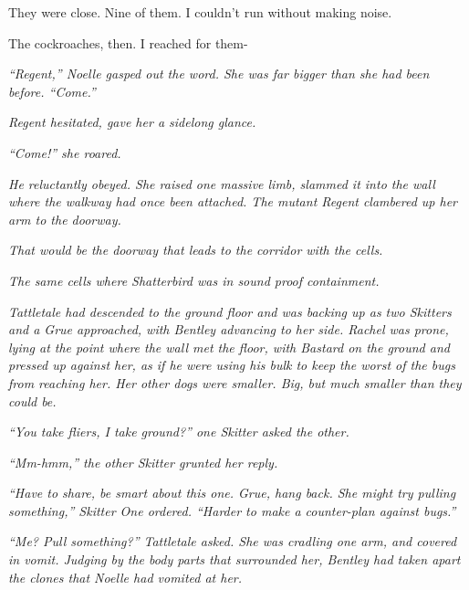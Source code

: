 They were close.  Nine of them.  I couldn't run without making noise.



The cockroaches, then.  I reached for them-



\sectionbreak



\emph{``Regent,'' Noelle gasped out the word.  She was far bigger than she had been before.  ``Come.''}



\emph{Regent hesitated, gave her a sidelong glance.}



\emph{``Come!'' she roared.}



\emph{He reluctantly obeyed.  She raised one massive limb, slammed it into the wall where the walkway had once been attached.  The mutant Regent clambered up her arm to the doorway.}



\emph{That would be the doorway that leads to the corridor with the cells.}



\emph{The same cells where Shatterbird was in sound proof containment.}



\emph{Tattletale had descended to the ground floor and was backing up as two Skitters and a Grue approached, with Bentley advancing to her side.  Rachel was prone, lying at the point where the wall met the floor, with Bastard on the ground and pressed up against her, as if he were using his bulk to keep the worst of the bugs from reaching her.  Her other dogs were smaller.  Big, but much smaller than they could be.}



\emph{``You take fliers, I take ground?'' one Skitter asked the other.}



\emph{``Mm-hmm,'' the other Skitter grunted her reply.}



\emph{``Have to share, be smart about this one.  Grue, hang back.  She might try pulling something,'' Skitter One ordered.  ``Harder to make a counter-plan against bugs.''}



\emph{``Me?  Pull something?'' Tattletale asked.  She was cradling one arm, and covered in vomit.  Judging by the body parts that surrounded her, Bentley had taken apart the clones that Noelle had vomited at her.}



